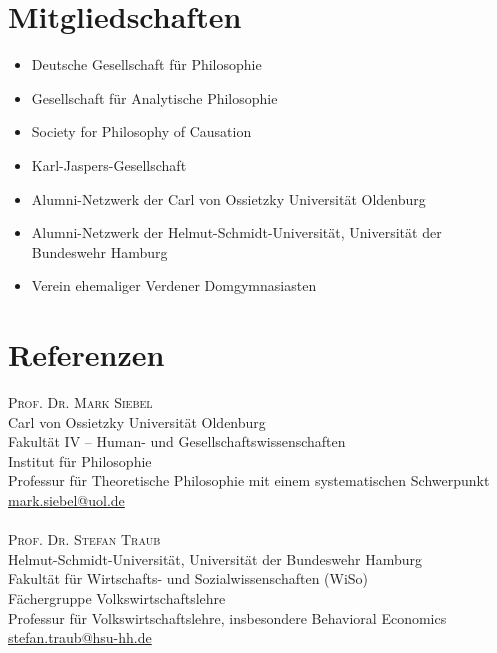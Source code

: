 \documentclass[a4paper,10pt]{article}
\begin{document}
\section{Mitgliedschaften}
\begin{itemize}
   \item Deutsche Gesellschaft für Philosophie
   \item Gesellschaft für Analytische Philosophie
   \item Society for Philosophy of Causation
   \item Karl-Jaspers-Gesellschaft
   \item Alumni-Netzwerk der Carl von Ossietzky Universität Oldenburg
   \item Alumni-Netzwerk der Helmut-Schmidt-Universität, Universität der Bundeswehr Hamburg
   \item Verein ehemaliger Verdener Domgymnasiasten
\end{itemize}


\clearpage
\section{Referenzen}
\textsc{Prof\hspace{0.5pt}. Dr\hspace{0.5pt}. Mark Siebel}\\
Carl von Ossietzky Universität Oldenburg\\
Fakultät IV -- Human- und Gesellschaftswissenschaften\\
Institut für Philosophie\\
Professur für Theoretische Philosophie mit einem systematischen Schwerpunkt\\
\href{mailto:mark.siebel@uol.de}{mark.siebel@uol.de}\\
\\
\textsc{Prof\hspace{0.5pt}. Dr\hspace{0.5pt}. Stefan Traub}\\
Helmut-Schmidt-Universität, Universität der Bundeswehr Hamburg\\
Fakultät für Wirtschafts- und Sozialwissenschaften (WiSo)\\
Fächergruppe Volkswirtschaftslehre\\
Professur für Volkswirtschaftslehre, insbesondere Behavioral Economics\\
\href{mailto:stefan.traub@hsu-hh.de}{stefan.traub@hsu-hh.de}\\
\end{document}
